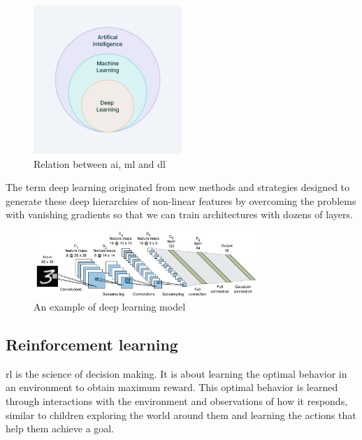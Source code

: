 \begin{figure}[H]
	\centering
	\includegraphics[width=0.5\textwidth]{Figures/AIHierarchy.png}
	\caption{Relation between \acrshort{ai}, \acrshort{ml} and \acrshort{dl}}
\end{figure}
\FloatBarrier

The term deep learning originated from new methods and strategies designed to generate these deep hierarchies of non-linear features by overcoming the problems with vanishing gradients so that we can train architectures with dozens of layers.

\begin{figure}[H]
	\centering
	\includegraphics[width=0.75\textwidth]{Figures/CNN.png}
	\caption{An example of deep learning model}
\end{figure}
\FloatBarrier

\subsection{Reinforcement learning}
\acrfull{rl} is the science of decision making. It is about learning the optimal behavior in an environment to obtain maximum reward. This optimal behavior is learned through interactions with the environment and observations of how it responds, similar to children exploring the world around them and learning the actions that help them achieve a goal.

